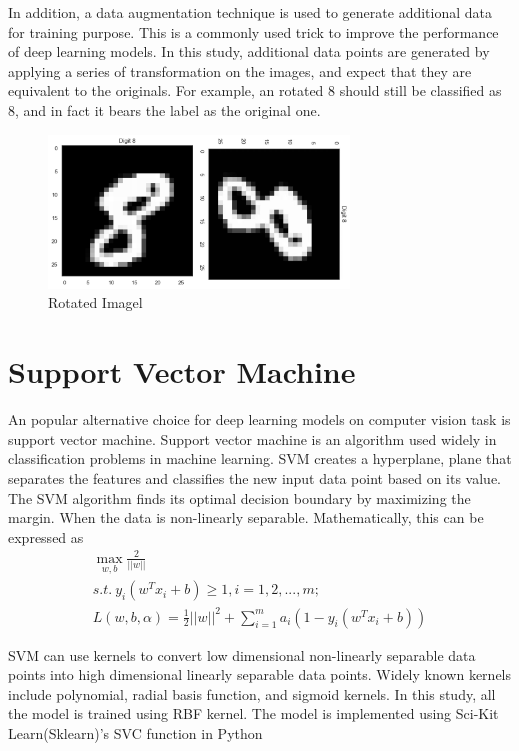 \documentclass[letterpaper]{article} %
\begin{document}
In addition, a data augmentation technique is used to generate additional data for training purpose. This is a commonly used trick to improve the performance of deep learning models. In this study, additional data points are generated by applying a series of transformation on the images, and expect that they are equivalent to the originals. For example, an rotated 8 should still be classified as 8, and in fact it bears the label as the original one. 
\begin{figure}[h]
\caption{ Rotated Imagel}
\centering
\includegraphics[width=8cm]{eight.jpg}  
\end{figure}


\section{Support Vector Machine}
An popular alternative choice for deep learning models on computer vision task is support vector machine. Support vector machine is an algorithm used widely in classification problems in machine learning. SVM creates a hyperplane, plane that separates the features and classifies the new input data point based on its value. The SVM algorithm finds its optimal decision boundary by maximizing the margin. When the data is non-linearly separable. Mathematically, this can be expressed as \\
\begin{align*}
\max_{w,b} \frac{2}{||w||} \\s.t.\ y_{i}(w^{T}x_{i} + b) \geq 1, i=1,2,...,m; \\ L(w,b,\alpha)=\frac{1}{2}||w||^2 + \sum^{m}_{i=1}a_{i}(1-y_{i}(w^{T}x_{i} + b))       
\end{align*}
 
SVM can use kernels to convert low dimensional non-linearly separable data points into high dimensional linearly separable data points. Widely known kernels include polynomial, radial basis function, and sigmoid kernels. In this study, all the model is trained using RBF kernel. The model is implemented using Sci-Kit Learn(Sklearn)'s SVC function in Python
\end{document}
